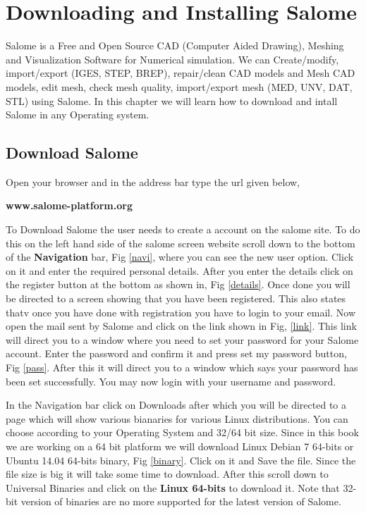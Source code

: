 \chapter{Downloading and Installing Salome}
\thispagestyle{empty}
\label{sec:chap10}
\newcommand{\LocCHtenfig}{\Origin/CHAPTERS/chap10/figures}

Salome is a Free and Open Source  CAD (Computer Aided Drawing), Meshing and Visualization Software for Numerical simulation. 
We can Create/modify, import/export (IGES, STEP, BREP), repair/clean CAD models and Mesh CAD models, edit mesh, check mesh quality, 
import/export mesh (MED, UNV, DAT, STL) using Salome. In this chapter we will learn how to download and intall Salome in any Operating system.

\section{Download Salome}

Open your browser and in the address bar type the url given below, \newline

\centering \textbf{www.salome-platform.org} \newline

\flushleft To Download Salome the user needs to create a account on the salome site. To do this on the left hand side of the salome screen website
scroll down to the bottom of the \textbf{Navigation} bar, Fig \ref{navi}, where you can see the new user option. Click on it and enter the required
personal details. \newline
\flushleft After you enter the details click on the register button at the bottom as shown in, Fig \ref{details}. Once done you will be directed 
to a screen showing that you have been registered. This also states thatv once you have done with registration you have to login to your email. Now 
open the mail sent by Salome and click on the link shown in Fig, \ref{link}. This link will direct you to a window where you need to set your password
for your Salome account. Enter the password and confirm it and press set my password button, Fig \ref{pass}. After this it will direct you to a window
which says your password has been set successfully. You may now login with your username and password. \newline

\flushleft In the Navigation bar click on Downloads after which you will be directed to a page which will show various bianaries for various Linux
distributions. You can choose according to your Operating System and 32/64 bit size. Since in this book we are working on a 64 bit platform we
will download Linux Debian 7 64-bits or Ubuntu 14.04 64-bits binary, Fig \ref{binary}. Click on it and Save the file. Since the file size is big it will take some time to download.
After this scroll down to Universal Binaries and click on the \textbf{Linux 64-bits} to download it. Note that 32-bit version of binaries are no
more supported for the latest version of Salome.

